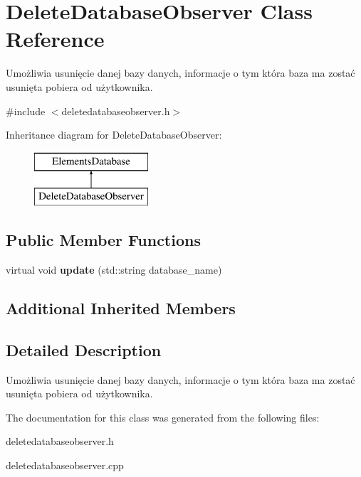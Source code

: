 \hypertarget{class_delete_database_observer}{}\section{Delete\+Database\+Observer Class Reference}
\label{class_delete_database_observer}


Umożliwia usunięcie danej bazy danych, informacje o tym która baza ma zostać usunięta pobiera od użytkownika.  




{\ttfamily \#include $<$deletedatabaseobserver.\+h$>$}

Inheritance diagram for Delete\+Database\+Observer\+:\begin{figure}[H]
\begin{center}
\leavevmode
\includegraphics[height=2.000000cm]{class_delete_database_observer}
\end{center}
\end{figure}
\subsection*{Public Member Functions}
\begin{DoxyCompactItemize}
\item 
\mbox{\label{class_delete_database_observer_aac4b2fa8fd6c4d160fd39e2d3fb0d1a0}} 
virtual void {\bfseries update} (std\+::string database\+\_\+name)
\end{DoxyCompactItemize}
\subsection*{Additional Inherited Members}


\subsection{Detailed Description}
Umożliwia usunięcie danej bazy danych, informacje o tym która baza ma zostać usunięta pobiera od użytkownika. 

The documentation for this class was generated from the following files\+:\begin{DoxyCompactItemize}
\item 
deletedatabaseobserver.\+h\item 
deletedatabaseobserver.\+cpp\end{DoxyCompactItemize}
